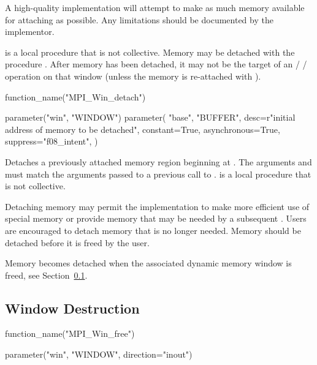 \begin{implementors}
A high-quality implementation will attempt to make as much memory
available for attaching as possible. Any limitations should be
documented by the implementor.
\end{implementors}

 is a local procedure that is not collective.
%
Memory may be detached with the procedure
. After memory has been
detached, it may not be the target of an \MPI/ \RMA/ operation on 
that window (unless the 
memory is re-attached with ).

\begin{mpi-binding}
    function_name("MPI_Win_detach")
    
    parameter("win", "WINDOW")
    parameter(
        "base",
        "BUFFER",
        desc=r"initial address of memory to be detached",
        constant=True,
        asynchronous=True,
        suppress="f08_intent",
    )
\end{mpi-binding}

Detaches a previously attached memory region beginning at
. The arguments  and 
must match the arguments passed to a previous call to
.
 is a local procedure that is not collective.


\begin{users}
Detaching memory may permit the implementation to make more
efficient use of special memory or provide memory that may be needed
by a subsequent .  Users are encouraged to
detach memory that is no longer needed.
Memory should be detached before it is freed by the user.
\end{users}

Memory becomes detached when the associated dynamic memory window is
freed, see Section~\ref{sec:rma-win-free}.

\subsection{Window Destruction}
\label{sec:rma-win-free}

%
\begin{mpi-binding}
    function_name("MPI_Win_free")
    
    parameter("win", "WINDOW", direction="inout")
\end{mpi-binding}

